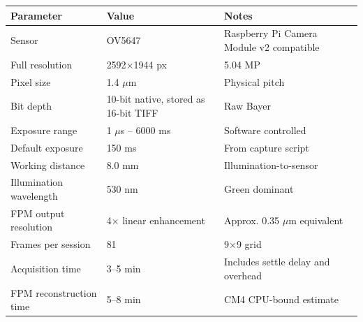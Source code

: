 \begin{longtable}{L{4cm}L{4cm}L{5cm}}
\toprule
\textbf{Parameter} & \textbf{Value} & \textbf{Notes} \\
\midrule
Sensor & OV5647 & Raspberry Pi Camera Module v2 compatible \\
Full resolution & 2592$\times$1944 px & 5.04 MP \\
Pixel size & 1.4 $\mu$m & Physical pitch \\
Bit depth & 10-bit native, stored as 16-bit TIFF & Raw Bayer \\
Exposure range & 1 $\mu$s -- 6000 ms & Software controlled \\
Default exposure & 150 ms & From capture script \\
Working distance & 8.0 mm & Illumination-to-sensor \\
Illumination wavelength & 530 nm & Green dominant \\
FPM output resolution & 4$\times$ linear enhancement & Approx. 0.35 $\mu$m equivalent \\
Frames per session & 81 & 9$\times$9 grid \\
Acquisition time & 3--5 min & Includes settle delay and overhead \\
FPM reconstruction time & 5--8 min & CM4 CPU-bound estimate \\
\bottomrule
\end{longtable}
